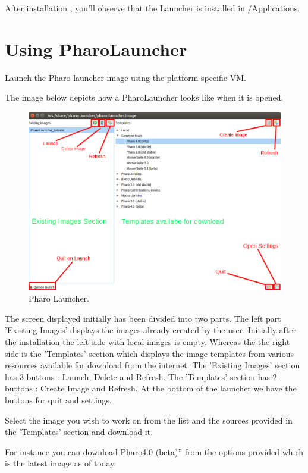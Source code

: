 \documentclass[a4paper,10pt,twoside]{book}
\begin{document}
After installation , you'll observe that the Launcher is installed in $/$Applications. 
\section{Using PharoLauncher}
Launch the Pharo launcher image using the platform-specific VM.

The image below depicts how a PharoLauncher looks like when it is opened.


\begin{figure}

\begin{center}
\includegraphics[width=1.0\textwidth]{figures/pharolauncher_edited_new.png}\caption{Pharo Launcher.\label{launcher}}\end{center}
\end{figure}


The screen displayed initially has been divided into two parts.
The left part 'Existing Images' displays the images already created by the user. Initially after the installation the left side with local images is empty.
Whereas the the right side is the 'Templates' section which displays the image templates from various resources available for download from the internet.
The 'Existing Images' section has 3 buttons : Launch, Delete and Refresh.
The 'Templates' section has 2 buttons : Create Image and Refresh.
At the bottom of the launcher we have the buttons for quit and settings.

Select the image you wish to work on from the list and the sources provided in the 'Templates' section and download it. 

For instance you can download Pharo4.0 (beta)” from the options provided which is the latest image as of today. 
\end{document}
